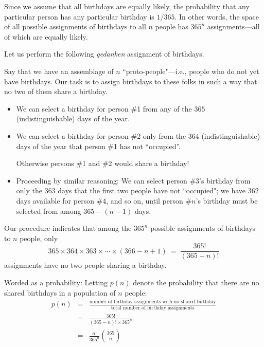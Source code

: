 \smallskip

Since we assume that all birthdays are equally likely, the probability that any particular person has any particular birthday is $1/365$.  In other words, the space of all possible assignments of birthdays to all $n$ people has $365^n$ assignments---all of which are equally likely.

\bigskip

Let us perform the following {\em gedanken} assignment of birthdays.

\smallskip

Say that we have an assemblage of $n$ ``proto-people"---i.e., people who do not yet have  birthdays.  Our task is to assign birthdays to these folks in such a way that no two of them share a birthday.
\begin{itemize}
\item
We can select a birthday for person \#1 from any of the $365$ (indistinguishable) days of the year.
\medskip\item
We can select a birthday for person \#2 only from the $364$ (indistinguishable) days of the year that person \#1 has not ``occupied''.

\smallskip

Otherwise persons \#1 and \#2 would share a birthday!
\medskip\item
Proceeding by similar reasoning:  We can select person \#3's birthday from only the $363$ days that the first two people have not ``occupied"; we have $362$ days available for person \#4, and so on, until person \#$n$'s birthday must be selected from among $365-(n-1)$ days.
\end{itemize}
Our procedure indicates that among the $365^n$ possible assignments of birthdays to $n$ people, only
\[ 365 \times 364 \times 363 \times \cdots \times (366-n+1) \ = \ \frac{365!}{(365-n)!}  \]
assignments have no two people sharing a birthday.

\smallskip

Worded as a probability: Letting $p(n)$ denote the probability that there are no shared birthdays in a population of $n$ people:
\begin{eqnarray*}
p(n) & = &
\frac{\mbox{number of birthday assignments with no shared birthday}}
{\mbox{total number of birthday assignments}} \\
 &  = & \frac{365!}{ (365-n)!  \times 365^n} \\
 & = & \frac{n!}{365^n} {365 \choose n}
\end{eqnarray*}

